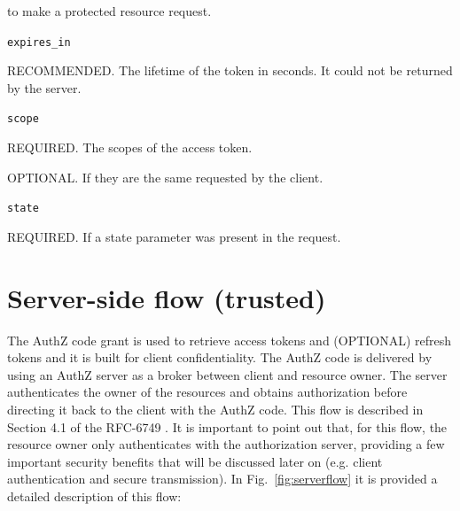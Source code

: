 \hspace{0.5cm}to make a protected resource request.

\texttt{expires\_in}

\hspace{0.5cm}RECOMMENDED. The lifetime of the token in seconds. It could not be returned by the server.

\texttt{scope}

\hspace{0.5cm}REQUIRED. The scopes of the access token.

\hspace{0.5cm}OPTIONAL. If they are the same requested by the client.

\texttt{state}

\hspace{0.5cm}REQUIRED. If a state parameter was present in the request.

\section{Server-side flow (trusted)}
\label{authcg}

The AuthZ code grant is used to retrieve access tokens and (OPTIONAL) refresh tokens and it is built for client confidentiality. The AuthZ code is delivered by using an AuthZ server as a broker between client and resource owner. The server authenticates the owner of the resources and obtains authorization before directing it back to the client with the AuthZ code. This flow is described in Section 4.1 of the RFC-6749 \cite{RFC6749}. It is important to point out that, for this flow, the resource owner only authenticates with the authorization server, providing a few important security benefits that will be discussed later on (e.g. client authentication and secure transmission). In Fig.~\ref{fig:serverflow} it is provided a detailed description of this flow:


